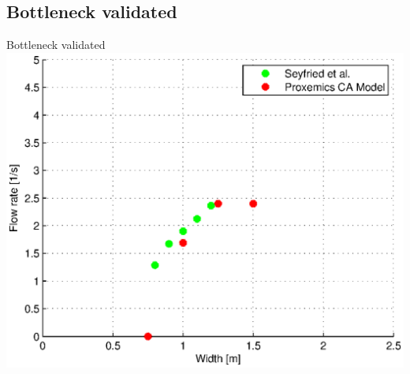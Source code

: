 \subsection{Bottleneck validated}
\begin{frame}{Bottleneck validated}
\includegraphics[width=\textwidth,height=0.8\textheight,keepaspectratio]{wykresy-bottleneck_validated}
\end{frame}